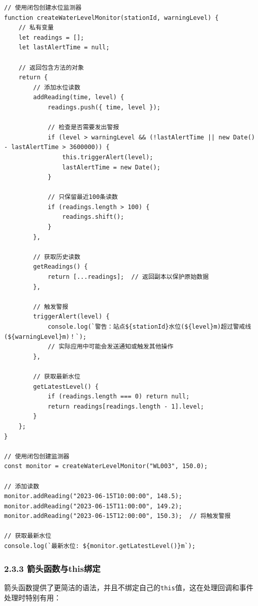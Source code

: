 \begin{lstlisting}
// 使用闭包创建水位监测器
function createWaterLevelMonitor(stationId, warningLevel) {
    // 私有变量
    let readings = [];
    let lastAlertTime = null;
    
    // 返回包含方法的对象
    return {
        // 添加水位读数
        addReading(time, level) {
            readings.push({ time, level });
            
            // 检查是否需要发出警报
            if (level > warningLevel && (!lastAlertTime || new Date() - lastAlertTime > 3600000)) {
                this.triggerAlert(level);
                lastAlertTime = new Date();
            }
            
            // 只保留最近100条读数
            if (readings.length > 100) {
                readings.shift();
            }
        },
        
        // 获取历史读数
        getReadings() {
            return [...readings];  // 返回副本以保护原始数据
        },
        
        // 触发警报
        triggerAlert(level) {
            console.log(`警告：站点${stationId}水位(${level}m)超过警戒线(${warningLevel}m)！`);
            // 实际应用中可能会发送通知或触发其他操作
        },
        
        // 获取最新水位
        getLatestLevel() {
            if (readings.length === 0) return null;
            return readings[readings.length - 1].level;
        }
    };
}

// 使用闭包创建监测器
const monitor = createWaterLevelMonitor("WL003", 150.0);

// 添加读数
monitor.addReading("2023-06-15T10:00:00", 148.5);
monitor.addReading("2023-06-15T11:00:00", 149.2);
monitor.addReading("2023-06-15T12:00:00", 150.3);  // 将触发警报

// 获取最新水位
console.log(`最新水位: ${monitor.getLatestLevel()}m`);
\end{lstlisting}

\subsubsection{2.3.3
箭头函数与this绑定}\label{ux7badux5934ux51fdux6570ux4e0ethisux7ed1ux5b9a}

箭头函数提供了更简洁的语法，并且不绑定自己的\passthrough{\lstinline!this!}值，这在处理回调和事件处理时特别有用：

